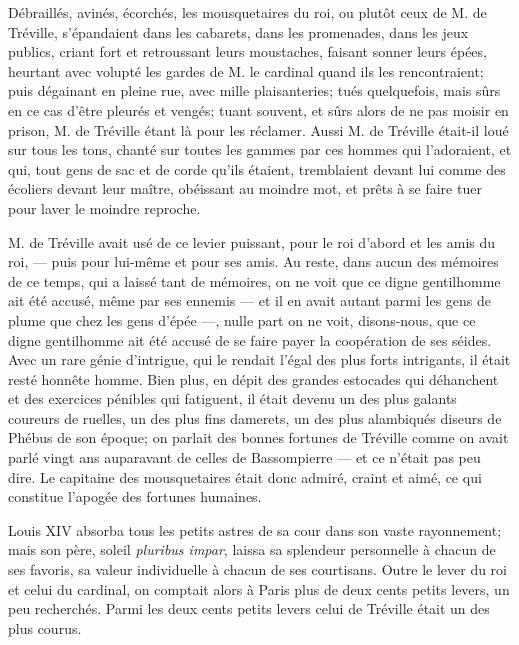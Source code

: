Débraillés, avinés, écorchés, les mousquetaires du roi, ou plutôt ceux de M. de Tréville, s'épandaient dans les cabarets, dans les promenades, dans les jeux publics, criant fort et retroussant leurs moustaches, faisant sonner leurs épées, heurtant avec volupté les gardes de M. le cardinal quand ils les rencontraient; puis dégainant en pleine rue, avec mille plaisanteries; tués quelquefois, mais sûrs en ce cas d'être pleurés et vengés; tuant souvent, et sûrs alors de ne pas moisir en prison, M. de Tréville étant là pour les réclamer. Aussi M. de Tréville était-il loué sur tous les tons, chanté sur toutes les gammes par ces hommes qui l'adoraient, et qui, tout gens de sac et de corde qu'ils étaient, tremblaient devant lui comme des écoliers devant leur maître, obéissant au moindre mot, et prêts à se faire tuer pour laver le moindre reproche. 

M. de Tréville avait usé de ce levier puissant, pour le roi d'abord et les amis du roi, --- puis pour lui-même et pour ses amis. Au reste, dans aucun des mémoires de ce temps, qui a laissé tant de mémoires, on ne voit que ce digne gentilhomme ait été accusé, même par ses ennemis --- et il en avait autant parmi les gens de plume que chez les gens d'épée ---, nulle part on ne voit, disons-nous, que ce digne gentilhomme ait été accusé de se faire payer la coopération de ses séides. Avec un rare génie d'intrigue, qui le rendait l'égal des plus forts intrigants, il était resté honnête homme. Bien plus, en dépit des grandes estocades qui déhanchent et des exercices pénibles qui fatiguent, il était devenu un des plus galants coureurs de ruelles, un des plus fins damerets, un des plus alambiqués diseurs de Phébus de son époque; on parlait des bonnes fortunes de Tréville comme on avait parlé vingt ans auparavant de celles de Bassompierre --- et ce n'était pas peu dire. Le capitaine des mousquetaires était donc admiré, craint et aimé, ce qui constitue l'apogée des fortunes humaines. 

Louis XIV absorba tous les petits astres de sa cour dans son vaste rayonnement; mais son père, soleil \textit{pluribus impar}, laissa sa splendeur personnelle à chacun de ses favoris, sa valeur individuelle à chacun de ses courtisans. Outre le lever du roi et celui du cardinal, on comptait alors à Paris plus de deux cents petits levers, un peu recherchés. Parmi les deux cents petits levers celui de Tréville était un des plus courus. 

